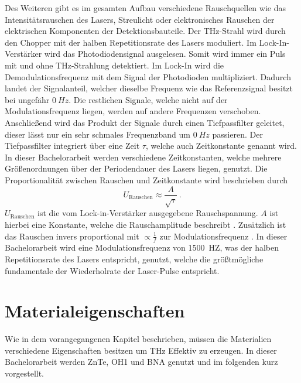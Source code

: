 Des Weiteren gibt es im gesamten Aufbau verschiedene Rauschquellen wie das Intensitätsrauschen des Lasers, 
Streulicht oder elektronisches Rauschen der elektrischen Komponenten der Detektionsbauteile.
Der THz-Strahl wird durch den Chopper mit der halben Repetitionsrate des Lasers moduliert. 
Im Lock-In-Verstärker wird das Photodiodensignal ausgelesen. 
Somit wird immer ein Puls mit und ohne THz-Strahlung detektiert. 
Im Lock-In wird die Demodulationsfrequenz mit dem Signal der Photodioden multipliziert. 
Dadurch landet der Signalanteil, welcher dieselbe Frequenz wie das Referenzsignal besitzt 
bei ungefähr $\SI{0}{Hz}$. 
Die restlichen Signale, welche nicht auf der Modulationsfrequenz liegen, werden auf andere Frequenzen 
verschoben. 
Anschließend wird das Produkt der Signale durch einen Tiefpassfilter geleitet, 
dieser lässt nur ein sehr schmales Frequenzband um $\SI{0}{Hz}$ passieren. 
Der Tiefpassfilter integriert über eine Zeit $\tau$, welche auch Zeitkonstante genannt wird. In dieser Bachelorarbeit 
werden verschiedene Zeitkonstanten, welche mehrere Größenordnungen über der Periodendauer des Lasers liegen, genutzt. 
Die Proportionalität zwischen Rauschen und Zeitkonstante wird beschrieben durch 
\begin{equation}
    \label{eqn:tc}
    U_\text{Rauschen} \approx \frac{A}{\sqrt{\tau}}\,.
\end{equation} 
$U_\text{Rauschen}$ ist die vom Lock-in-Verstärker ausgegebene Rauschspannung. 
$A$ ist hierbei eine Konstante, 
welche die Rauschamplitude beschreibt \cite{zhinst_lockin_whitepaper}.
Zusätzlich ist das Rauschen invers proportional mit $\propto \frac 1 f$ zur Modulationsfrequenz \cite{10.1063/1.5047659}. 
In dieser Bachelorarbeit wird eine Modulationsfrequenz von \SI{1500}{HZ}, was der halben Repetitionsrate des Lasers entspricht, genutzt, 
welche die größtmögliche fundamentale der Wiederholrate der Laser-Pulse entspricht.





\chapter{Materialeigenschaften}
\label{sec:ME}

Wie in dem vorangegangenen Kapitel beschrieben, müssen die Materialien verschiedene Eigenschaften besitzen um 
THz Effektiv zu erzeugen. 
In dieser Bachelorarbeit werden ZnTe, OH1 und BNA genutzt und im folgenden kurz vorgestellt.

